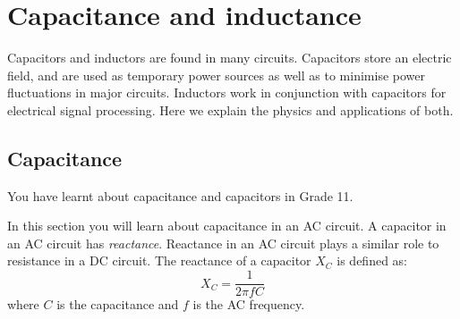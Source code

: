 \section{Capacitance and inductance}

Capacitors and inductors are found in many circuits. Capacitors store an electric field, and are used as temporary power sources as well as to minimise power fluctuations in major circuits. Inductors work in conjunction with capacitors for electrical signal processing. Here we explain the physics and applications of both.

\subsection{Capacitance}
You have learnt about capacitance and capacitors in Grade 11. %
 
In this section you will learn about capacitance in an AC circuit. A capacitor in an AC circuit has \textit{reactance}. Reactance in an AC circuit plays a similar role to resistance in a DC circuit. The reactance of a capacitor $X_C$ is defined as:\\
\begin{equation*}
X_C=\frac{1}{2\pi fC}
\end{equation*}
where $C$ is the capacitance and $f$ is the AC frequency.\\
 
